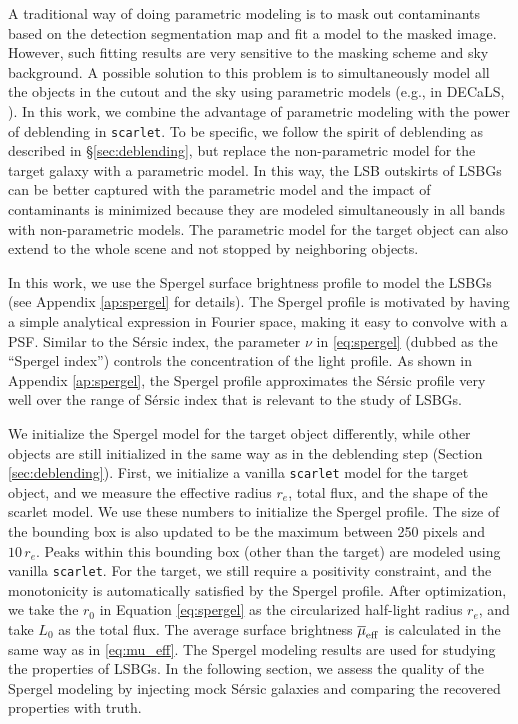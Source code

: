 \documentclass[twocolumn,astrosymb,twocolappendix]{aastex631}
\newcommand{\code}[1]{\texttt{#1}}
\newcommand{\sersic}{S\'ersic}
\begin{document}
\begin{CJK*}{UTF8}{gbsn}
A traditional way of doing parametric modeling is to mask out contaminants based on the detection segmentation map and fit a model to the masked image. However, such fitting results are very sensitive to the masking scheme \citep[e.g.,][]{Greco2018} and sky background. A possible solution to this problem is to simultaneously model all the objects in the cutout and the sky using parametric models (e.g., in DECaLS, \citealt{Lang2016,Dey2019}). In this work, we combine the advantage of parametric modeling with the power of deblending in \code{scarlet}. To be specific, we follow the spirit of deblending as described in \S\ref{sec:deblending}, but replace the non-parametric model for the target galaxy with a parametric model. In this way, the LSB outskirts of LSBGs can be better captured with the parametric model and the impact of contaminants is minimized because they are modeled simultaneously in all bands with non-parametric models. The parametric model for the target object can also extend to the whole scene and not stopped by neighboring objects. 

In this work, we use the Spergel surface brightness profile \citep{Spergel2010} to model the LSBGs (see Appendix \ref{ap:spergel} for details). The Spergel profile is motivated by having a simple analytical expression in Fourier space, making it easy to convolve with a PSF. Similar to the \sersic{} index, the parameter $\nu$ in \eqref{eq:spergel} (dubbed as the ``Spergel index'') controls the concentration of the light profile. As shown in Appendix \ref{ap:spergel}, the Spergel profile approximates the \sersic{} profile very well over the range of \sersic{} index that is relevant to the study of LSBGs.

We initialize the Spergel model for the target object differently, while other objects are still initialized in the same way as in the deblending step (Section \ref{sec:deblending}). First, we initialize a vanilla \code{scarlet} model for the target object, and we measure the effective radius $r_e$, total flux, and the shape of the scarlet model. We use these numbers to initialize the Spergel profile. The size of the bounding box is also updated to be the maximum between 250 pixels and $10\, r_e$. Peaks within this bounding box (other than the target) are modeled using vanilla \code{scarlet}. For the target, we still require a positivity constraint, and the monotonicity is automatically satisfied by the Spergel profile. After optimization, we take the $r_0$ in Equation \eqref{eq:spergel} as the circularized half-light radius $r_e$, and take $L_0$ as the total flux. The average surface brightness $\overline{\mu}_{\rm eff}$ is calculated in the same way as in \eqref{eq:mu_eff}. The Spergel modeling results are used for studying the properties of LSBGs. 
In the following section, we assess the quality of the Spergel modeling by injecting mock \sersic{} galaxies and comparing the recovered properties with truth. 


\end{CJK*}
\end{document}
